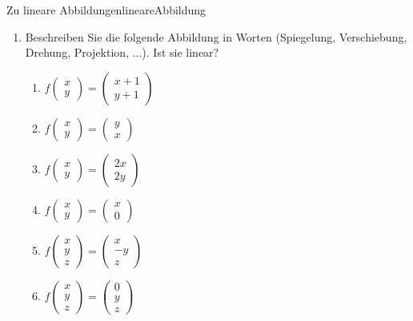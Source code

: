 \begin{ueb}{Zu lineare Abbildungen}{lineareAbbildung}
    \begin{enumerate}
        \item Beschreiben Sie die folgende Abbildung in Worten (Spiegelung, Verschiebung, Drehung, Projektion, ...). Ist sie linear?
        \begin{enumerate}
            \item \( f \begin{pmatrix} x \\ y \end{pmatrix} = \begin{pmatrix} x+1 \\ y+1 \end{pmatrix} \)
            \item \( f \begin{pmatrix} x \\ y \end{pmatrix} = \begin{pmatrix} y \\ x \end{pmatrix} \)
            \item \( f \begin{pmatrix} x \\ y \end{pmatrix} = \begin{pmatrix} 2x \\ 2y \end{pmatrix} \)
            \item \( f \begin{pmatrix} x \\ y \end{pmatrix} = \begin{pmatrix} x \\ 0 \end{pmatrix} \)
            \item \( f \begin{pmatrix} x \\ y \\ z \end{pmatrix} = \begin{pmatrix} x \\ -y \\ z \end{pmatrix} \)
            \item \( f \begin{pmatrix} x \\ y \\ z \end{pmatrix} = \begin{pmatrix} 0 \\ y \\ z \end{pmatrix} \)
        \end{enumerate}
    

\end{enumerate}
\end{ueb}
